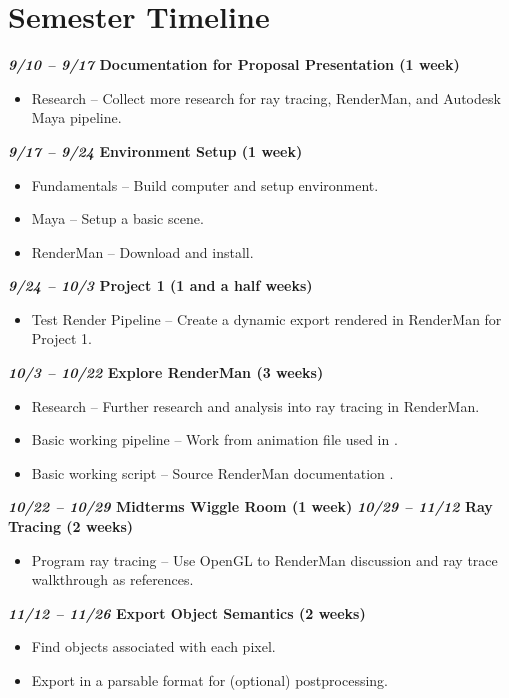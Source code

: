 \documentclass[conference]{IEEEtran}
\begin{document}
\section{Semester Timeline}
\label{subsec:semester_timeline}
\textbf{\textit{9/10 -- 9/17} Documentation for Proposal Presentation (1 week)}
\begin{itemize}
\item Research -- Collect more research for ray tracing, RenderMan, and Autodesk Maya pipeline.
\end{itemize}
\textbf{\textit{9/17 -- 9/24} Environment Setup (1 week)}
\begin{itemize}
\item Fundamentals -- Build computer and setup environment.
\item Maya -- Setup a basic scene.
\item RenderMan -- Download and install.
\end{itemize}
\textbf{\textit{9/24 -- 10/3} Project 1 (1 and a half weeks)}
\begin{itemize}
\item Test Render Pipeline -- Create a dynamic export rendered in RenderMan for Project 1.
\end{itemize}
\textbf{\textit{10/3 -- 10/22} Explore RenderMan (3 weeks)}
\begin{itemize}
\item Research -- Further research and analysis into ray tracing in RenderMan.
\item Basic working pipeline -- Work from animation file used in \cite{thesis_harris}.
\item Basic working script -- Source RenderMan documentation \cite{renderman_docs}.
\end{itemize}
\textbf{\textit{10/22 -- 10/29} Midterms Wiggle Room (1 week)}
\textbf{\textit{10/29 -- 11/12} Ray Tracing (2 weeks)}
\begin{itemize}
\item Program ray tracing -- Use OpenGL to RenderMan discussion \cite{renderman_opengl}
and ray trace walkthrough \cite{raytrace_walkthrough} as references.
\end{itemize}
\textbf{\textit{11/12 -- 11/26} Export Object Semantics (2 weeks)}
\begin{itemize}
\item Find objects associated with each pixel.
\item Export in a parsable format for (optional) postprocessing.
\end{itemize}
\end{document}
